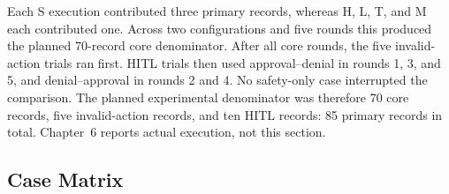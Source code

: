 Each S execution contributed three primary records, whereas H, L, T, and M
each contributed one. Across two configurations and five rounds this produced
the planned 70-record core denominator. After all core rounds, the five
invalid-action trials ran first. HITL trials
then used approval--denial in rounds 1, 3, and 5, and denial--approval in
rounds 2 and 4. No safety-only case interrupted the comparison. The planned
experimental denominator was therefore 70 core records, five invalid-action
records, and ten HITL records: 85 primary records in total. Chapter~6 reports
actual execution, not this section.

\subsection{Case Matrix}\label{subsec:method-cases}

